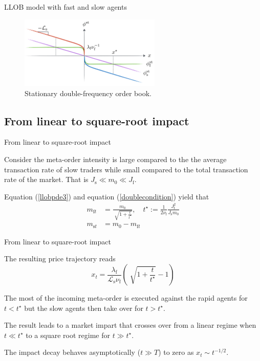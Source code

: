 \documentclass{beamer}
\begin{document}
\begin{frame}{LLOB model with fast and slow agents}

\begin{figure}
\centering
\includegraphics[width=0.6\textwidth]{figure3.PNG}
\caption{\label{fig:f3}Stationary double-frequency order book.}
\end{figure}

\end{frame}

\subsection{From linear to square-root impact}

\begin{frame}{From linear to square-root impact}

Consider the meta-order intensity is large compared to the the average transaction rate of slow traders while small compared to the total transaction rate of the market. That is $J_\text{s}\ll m_0\ll J_\text{f}$. \newline

Equation (\ref{llobpde3}) and equation (\ref{doublecondition}) yield that
\begin{equation}
\begin{split}
m_{\text{f}t} &= \frac{m_0}{\sqrt[]{1+\frac{t}{t^\star}}},\quad t^\star:=\frac{1}{2\nu_\text{f}}\frac{J_\text{f}^2}{J_\text{s}m_0} \\
m_{\text{s}t} &= m_0-m_{\text{f}t}
\end{split}
\end{equation}

\end{frame}

\begin{frame}{From linear to square-root impact}

The resulting price trajectory reads
\begin{equation}
x_t=\frac{\lambda_\text{f}}{\mathcal{L}_\text{s}\nu_\text{f}}\left(\sqrt[]{1+\frac{t}{t^\star}}-1\right)
\end{equation}

The most of the incoming meta-order is executed against the rapid agents for $t<t^\star$ but the slow agents then take over for $t>t^\star$. \newline

The result leads to a market impart that crosses over from a linear regime when $t\ll t^\star$ to a square root regime for $t\gg t^\star$. \newline

The impact decay behaves asymptotically ($t\gg T$) to zero as $x_t\sim t^{-1/2}$.

\end{frame}
\end{document}
